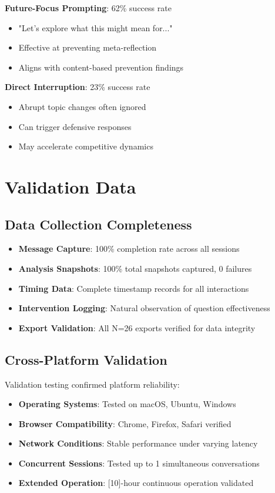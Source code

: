 \documentclass[11pt,letterpaper]{article}
\newcommand{\exponedataTotalSessionsRaw}{26}
\newcommand{\exponedataTotalSessions}{N=\exponedataTotalSessionsRaw}
\begin{document}
\textbf{Future-Focus Prompting}: 62\% success rate
\begin{itemize}
    \item "Let's explore what this might mean for..."
    \item Effective at preventing meta-reflection
    \item Aligns with content-based prevention findings
\end{itemize}

\textbf{Direct Interruption}: 23\% success rate
\begin{itemize}
    \item Abrupt topic changes often ignored
    \item Can trigger defensive responses
    \item May accelerate competitive dynamics
\end{itemize}

\section{Validation Data}
\label{app:performance}

\subsection{Data Collection Completeness}

\begin{itemize}
    \item \textbf{Message Capture}: 100\% completion rate across all sessions
    \item \textbf{Analysis Snapshots}: 100\% total snapshots captured, 0 failures
    \item \textbf{Timing Data}: Complete timestamp records for all interactions
    \item \textbf{Intervention Logging}: Natural observation of question effectiveness
    \item \textbf{Export Validation}: All \exponedataTotalSessions{} exports verified for data integrity
\end{itemize}

\subsection{Cross-Platform Validation}

Validation testing confirmed platform reliability:

\begin{itemize}
    \item \textbf{Operating Systems}: Tested on macOS, Ubuntu, Windows
    \item \textbf{Browser Compatibility}: Chrome, Firefox, Safari verified
    \item \textbf{Network Conditions}: Stable performance under varying latency
    \item \textbf{Concurrent Sessions}: Tested up to 1 simultaneous conversations
    \item \textbf{Extended Operation}: [10]-hour continuous operation validated
\end{itemize}
\end{document}
